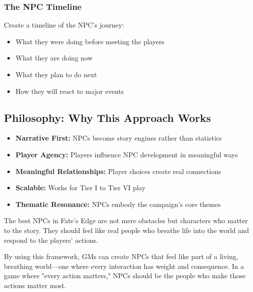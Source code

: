 \subsubsection{The NPC Timeline}

Create a timeline of the NPC's journey:

\begin{itemize}
  \item What they were doing before meeting the players
  \item What they are doing now
  \item What they plan to do next
  \item How they will react to major events
\end{itemize}

\subsection{Philosophy: Why This Approach Works}

\begin{itemize}
  \item \textbf{Narrative First:} NPCs become story engines rather than statistics
  \item \textbf{Player Agency:} Players influence NPC development in meaningful ways
  \item \textbf{Meaningful Relationships:} Player choices create real connections
  \item \textbf{Scalable:} Works for Tier I to Tier VI play
  \item \textbf{Thematic Resonance:} NPCs embody the campaign's core themes
\end{itemize}

The best NPCs in Fate's Edge are not mere obstacles but characters who matter to the story. They should feel like real people who breathe life into the world and respond to the players' actions.

By using this framework, GMs can create NPCs that feel like part of a living, breathing world---one where every interaction has weight and consequence. In a game where "every action matters," NPCs should be the people who make those actions matter most.



